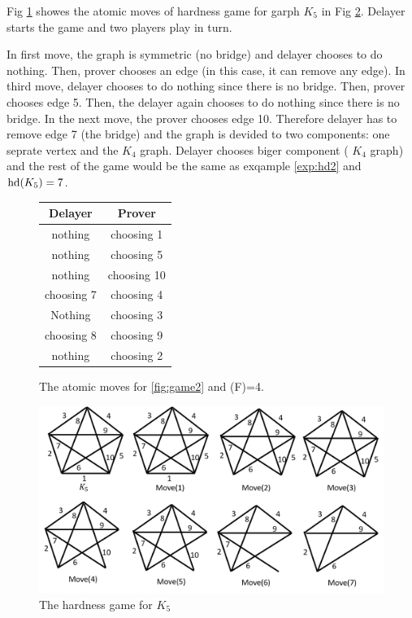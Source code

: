 \documentclass[12pt]{book}
\begin{document}
\begin{examp}\label{exp:hd3}
       Fig \ref{fig:game3} showes the atomic moves of hardness game for garph $K_5$ in Fig \ref{fig:hd3}. Delayer starts the game and two 
	   players play in turn. 
	   
	   In first move, the graph is symmetric (no bridge) and delayer chooses to do nothing. Then, prover chooses an edge (in this case, it can remove any edge). 
	   In third move, delayer chooses to do nothing since there is no bridge. Then, prover chooses edge 5. Then, the delayer again chooses to do nothing since 
	   there is no bridge. In the next move, the prover chooses edge 10. Therefore delayer has to remove edge 7 (the bridge) and the graph is devided to two components: 
	   one seprate vertex and the $K_4$ graph. 
	   Delayer chooses biger component ( $K_4$ graph) and the rest of the game would be the same as exqample \ref{exp:hd2} and $\operatorname{hd}(K_5)=7$.
	 
	   \begin{figure}[h]
      \centering
      \begin{tabular}{|c|c|} 
      \hline
                  Delayer & Prover \\ \hline
                  nothing & choosing 1  \\ \hline
				  nothing & choosing 5  \\ \hline
				  nothing & choosing 10  \\ \hline
                  choosing 7 & choosing 4  \\ \hline
				  Nothing & choosing 3  \\ \hline
                  choosing 8 & choosing 9  \\ \hline
				  nothing & choosing 2  \\ \hline
      \end{tabular}
      \caption{The atomic moves for \ref{fig:game2} and \hardness(F)=4.}
      \label{fig:game3}
      \end{figure}
	  \begin{figure}
      \begin{center}
      \includegraphics[scale =0.6]{g3.png}
      \caption{The hardness game for $K_5$}
	  \label{fig:hd3}
      \end{center}
      \end{figure}
\end{examp}
\end{document}
